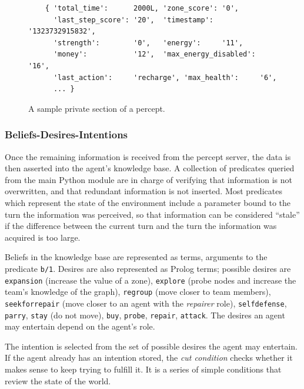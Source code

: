    \begin{figure}
    \centering
    \label{fig:pythonperceptprivate}
    \begin{small}
    \begin{verbatim}
    { 'total_time':      2000L, 'zone_score': '0',            
      'last_step_score': '20',  'timestamp':  '1323732915832',       
      'strength':        '0',   'energy':     '11',                  
      'money':           '12',  'max_energy_disabled': '16',                  
      'last_action':     'recharge', 'max_health':     '6',
      ... }
    \end{verbatim}
    \end{small}
    \caption{A sample private section of a percept.}
    \end{figure}

\subsubsection{Beliefs-Desires-Intentions}
    Once the remaining information is received from the percept server, the data
    is then asserted into the agent's knowledge base. A collection of predicates
    queried from the main Python module are in charge of verifying that
    information is not overwritten, and that redundant information is not
    inserted. Most predicates which represent the state of the environment
    include a parameter bound to the turn the information was perceived, so that
    information can be considered ``stale'' if the difference between the
    current turn and the turn the information was acquired is too large.
    
    Beliefs in the knowledge base are represented as terms, arguments to the
    predicate \texttt{b/1}.  Desires are also represented as Prolog terms;
    possible desires are \texttt{expansion} (increase the value of a zone),
    \texttt{explore} (probe nodes and increase the team's knowledge of the
    graph), \texttt{regroup} (move closer to team members),
    \texttt{seekforrepair} (move closer to an agent with the \textit{repairer}
    role), \texttt{selfdefense}, \texttt{parry}, \texttt{stay} (do not move),
    \texttt{buy}, \texttt{probe}, \texttt{repair}, \texttt{attack}. The desires
    an agent may entertain depend on the agent's role. 
    
    The intention is selected from the set of possible desires the agent may
    entertain.  If the agent already has an intention stored, the \textit{cut
    condition} checks whether it makes sense to keep trying to fulfill it. It is
    a series of simple conditions that review the state of the world.

